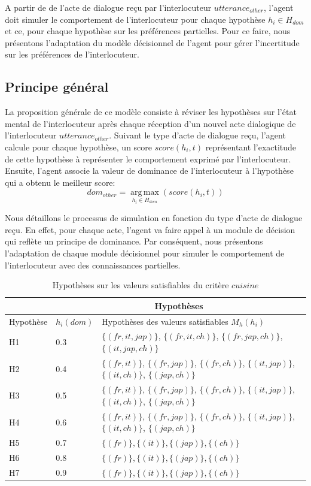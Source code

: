 A partir de de l'acte de dialogue reçu par l'interlocuteur $utterance_{other}$, l'agent doit simuler le comportement de l'interlocuteur pour chaque hypothèse $h_i \in H_{dom}$ et ce, pour chaque hypothèse sur les préférences partielles. Pour ce faire, nous présentons l'adaptation du modèle décisionnel de l'agent pour gérer l'incertitude sur les préférences de l'interlocuteur. 
	\subsection{Principe général}
	La proposition générale de ce modèle consiste à réviser les hypothèses sur l'état mental de l'interlocuteur après chaque réception d'un nouvel acte dialogique de l'interlocuteur $utterance_{other}$. Suivant le type d'acte de dialogue reçu, l'agent calcule pour chaque hypothèse, un score $score(h_i,t)$ représentant l'exactitude de cette hypothèse à représenter le comportement exprimé par l'interlocuteur. Ensuite, l'agent associe la valeur de dominance de l'interlocuteur à l'hypothèse qui a obtenu le meilleur score:
	\begin{equation}
	dom_{other} = \operatorname*{arg\,max}_{h_i \in H_{dom}} (score(h_i,t))
	\end{equation}
	
	Nous détaillons le processus de simulation en fonction du type d'acte de dialogue reçu. En effet, pour chaque acte, l'agent va faire appel à un module de décision qui reflète un principe de dominance. Par conséquent, nous présentons l'adaptation de chaque module décisionnel pour simuler le comportement de l'interlocuteur avec des connaissances partielles.
	\begin{table}[h]
		\centering
		\caption{Hypothèses sur les valeurs satisfiables du critère $cuisine$}
		\begin{tabular}{ p{2cm} p{1.5cm} p{8cm}}
			\hline
			\hline
			& \multicolumn{2}{c}{Hypothèses}  \\
			\hline
			\hline
			Hypothèse & $h_i(dom)$ & Hypothèses des valeurs satisfiables $ M_h(h_i)$\\
			\hline
			H1&0.3&$\{(fr,it,jap)\}$, $\{(fr,it,ch)\}$, $\{(fr,jap,ch)\}$, $\{(it,jap,ch)\}$ \\
			\hline
			H2&0.4&$\{(fr,it)\}$, $\{(fr,jap)\}$, $\{(fr,ch)\}$, $\{(it,jap)\}$, $\{(it,ch)\}$, $\{(jap,ch)\}$ \\
			\hline
			H3&0.5&$\{(fr,it)\}$, $\{(fr,jap)\}$, $\{(fr,ch)\}$, $\{(it,jap)\}$, $\{(it,ch)\}$, $\{(jap,ch)\}$\\
			\hline
			H4&0.6&$\{(fr,it)\}$, $\{(fr,jap)\}$, $\{(fr,ch)\}$, $\{(it,jap)\}$, $\{(it,ch)\}$, $\{(jap,ch)\}$ \\
			\hline
			H5&0.7&$\{(fr)\}, \{(it)\}, \{(jap)\}, \{(ch)\}$\\
			\hline
			H6&0.8&$\{(fr)\}, \{(it)\}, \{(jap)\}, \{(ch)\}$ \\
			\hline
			
			H7&0.9&$\{(fr)\}, \{(it)\}, \{(jap)\}, \{(ch)\}$ \\
			\hline
			\hline
		\end{tabular}		
		\label{tab:hypo}
	\end{table} 


